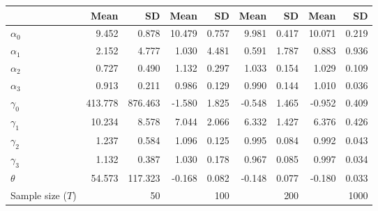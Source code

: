 
\begin{tabular}[t]{lrrrrrrrr}
\toprule
  & Mean & SD & Mean  & SD  & Mean   & SD   & Mean    & SD   \\
\midrule
$\alpha_{0}$ & 9.452 & 0.878 & 10.479 & 0.757 & 9.981 & 0.417 & 10.071 & 0.219\\
$\alpha_{1}$ & 2.152 & 4.777 & 1.030 & 4.481 & 0.591 & 1.787 & 0.883 & 0.936\\
$\alpha_{2}$ & 0.727 & 0.490 & 1.132 & 0.297 & 1.033 & 0.154 & 1.029 & 0.109\\
$\alpha_{3}$ & 0.913 & 0.211 & 0.986 & 0.129 & 0.990 & 0.144 & 1.010 & 0.036\\
$\gamma_{0}$ & 413.778 & 876.463 & -1.580 & 1.825 & -0.548 & 1.465 & -0.952 & 0.409\\
$\gamma_{1}$ & 10.234 & 8.578 & 7.044 & 2.066 & 6.332 & 1.427 & 6.376 & 0.426\\
$\gamma_{2}$ & 1.237 & 0.584 & 1.096 & 0.125 & 0.995 & 0.084 & 0.992 & 0.043\\
$\gamma_{3}$ & 1.132 & 0.387 & 1.030 & 0.178 & 0.967 & 0.085 & 0.997 & 0.034\\
$\theta$ & 54.573 & 117.323 & -0.168 & 0.082 & -0.148 & 0.077 & -0.180 & 0.033\\
Sample size ($T$) &  & 50 &  & 100 &  & 200 &  & 1000\\
\bottomrule
\end{tabular}
